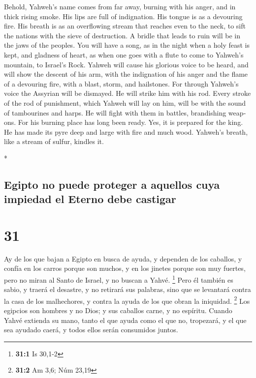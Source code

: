 \begin{paracol}{2}
\begin{otherlanguage}{english}
 Behold, Yahweh's name comes from far away, burning with
his anger, and in thick rising smoke. His lips are full of indignation.
His tongue is as a devouring fire.  His breath is as an
overflowing stream that reaches even to the neck, to sift the nations
with the sieve of destruction. A bridle that leads to ruin will be in
the jaws of the peoples.  You will have a song, as in the
night when a holy feast is kept, and gladness of heart, as when one goes
with a flute to come to Yahweh's mountain, to Israel's Rock.
 Yahweh will cause his glorious voice to be heard, and
will show the descent of his arm, with the indignation of his anger and
the flame of a devouring fire, with a blast, storm, and hailstones.
 For through Yahweh's voice the Assyrian will be
dismayed. He will strike him with his rod.  Every stroke
of the rod of punishment, which Yahweh will lay on him, will be with the
sound of tambourines and harps. He will fight with them in battles,
brandishing weapons.  For his burning place has long been
ready. Yes, it is prepared for the king. He has made its pyre deep and
large with fire and much wood. Yahweh's breath, like a stream of sulfur,
kindles it.

\end{otherlanguage}

\switchcolumn[0]*

\hypertarget{egipto-no-puede-proteger-a-aquellos-cuya-impiedad-el-eterno-debe-castigar}{%
\subsection{Egipto no puede proteger a aquellos cuya impiedad el Eterno
debe
castigar}\label{egipto-no-puede-proteger-a-aquellos-cuya-impiedad-el-eterno-debe-castigar}}

\hypertarget{section-60}{%
\section{31}\label{section-60}}

 Ay de los que bajan a Egipto en busca de ayuda, y
dependen de los caballos, y confía en los carros porque son muchos, y en
los jinetes porque son muy fuertes, pero no miran al Santo de Israel, y
no buscan a Yahvé. \footnote{\textbf{31:1} Is 30,1-2} 
Pero él también es sabio, y traerá el desastre, y no retirará sus
palabras, sino que se levantará contra la casa de los malhechores, y
contra la ayuda de los que obran la iniquidad. \footnote{\textbf{31:2}
  Am 3,6; Núm 23,19}  Los egipcios son hombres y no Dios;
y sus caballos carne, y no espíritu. Cuando Yahvé extienda su mano,
tanto el que ayuda como el que no, tropezará, y el que sea ayudado
caerá, y todos ellos serán consumidos juntos.


\end{paracol}
